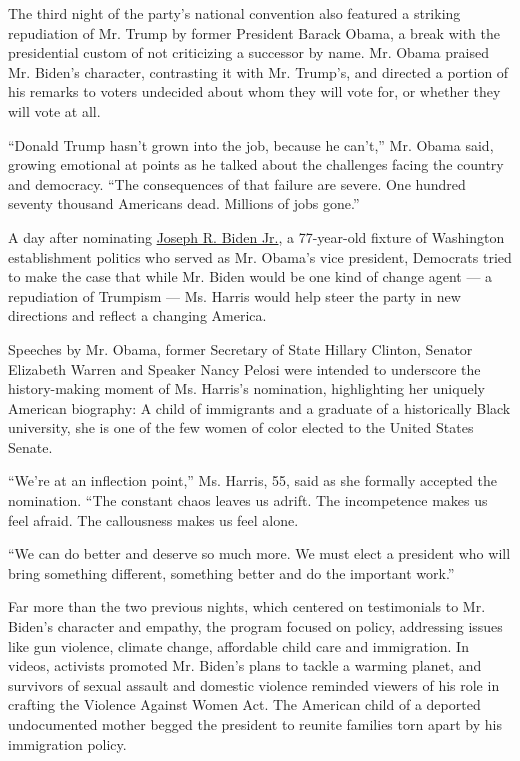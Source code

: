 The third night of the party's national convention also featured a
striking repudiation of Mr. Trump by former President Barack Obama, a
break with the presidential custom of not criticizing a successor by
name. Mr. Obama praised Mr. Biden's character, contrasting it with Mr.
Trump's, and directed a portion of his remarks to voters undecided about
whom they will vote for, or whether they will vote at all.

``Donald Trump hasn't grown into the job, because he can't,'' Mr. Obama
said, growing emotional at points as he talked about the challenges
facing the country and democracy. ``The consequences of that failure are
severe. One hundred seventy thousand Americans dead. Millions of jobs
gone.''

A day after nominating
\href{https://www.nytimes3xbfgragh.onion/2020/08/20/us/politics/joe-biden-convention-speech.html}{Joseph
R. Biden Jr.}, a 77-year-old fixture of Washington establishment
politics who served as Mr. Obama's vice president, Democrats tried to
make the case that while Mr. Biden would be one kind of change agent ---
a repudiation of Trumpism --- Ms. Harris would help steer the party in
new directions and reflect a changing America.

Speeches by Mr. Obama, former Secretary of State Hillary Clinton,
Senator Elizabeth Warren and Speaker Nancy Pelosi were intended to
underscore the history-making moment of Ms. Harris's nomination,
highlighting her uniquely American biography: A child of immigrants and
a graduate of a historically Black university, she is one of the few
women of color elected to the United States Senate.

``We're at an inflection point,'' Ms. Harris, 55, said as she formally
accepted the nomination. ``The constant chaos leaves us adrift. The
incompetence makes us feel afraid. The callousness makes us feel alone.

``We can do better and deserve so much more. We must elect a president
who will bring something different, something better and do the
important work.''

Far more than the two previous nights, which centered on testimonials to
Mr. Biden's character and empathy, the program focused on policy,
addressing issues like gun violence, climate change, affordable child
care and immigration. In videos, activists promoted Mr. Biden's plans to
tackle a warming planet, and survivors of sexual assault and domestic
violence reminded viewers of his role in crafting the Violence Against
Women Act. The American child of a deported undocumented mother begged
the president to reunite families torn apart by his immigration policy.

